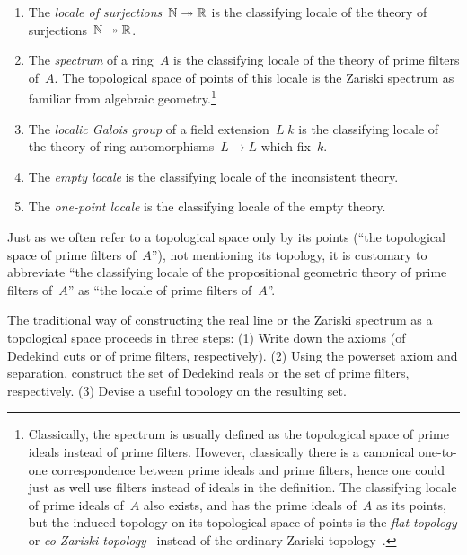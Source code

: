 \documentclass{ws-rv9x6}
\begin{document}
{\begin{enumerate}
The localic open unit interval is the classifying locale of the
same theory but with the additional axiom~$\top \vdash \alpha_0 \wedge \beta_1$.
\item The \emph{locale of surjections~$\mathbb{N} \twoheadrightarrow \mathbb{R}$} is the
classifying locale of the theory of surjections~$\mathbb{N} \twoheadrightarrow \mathbb{R}$.
\item The \emph{spectrum} of a ring~$A$ is the classifying locale of the
theory of prime filters of~$A$. The topological space of points of this locale
is the Zariski spectrum as familiar from algebraic
geometry.\footnote{Classically, the spectrum is usually defined as the
topological space of prime ideals instead of prime filters. However,
classically there is a canonical one-to-one correspondence between prime ideals
and prime filters, hence one could just as well use filters instead of ideals
in the definition. The classifying locale of prime ideals of~$A$ also exists,
and has the prime ideals of~$A$ as its points, but the induced topology on its
topological space of points is the \emph{flat topology} or \emph{co-Zariski
topology}~\cite{tarizadeh:flat} instead of the ordinary
Zariski topology~\cite[Proposition~4.5]{johnstone:rings-fields-and-spectra}.}
\item The \emph{localic Galois group} of a field extension~$L|k$ is the
classifying locale of the theory of ring automorphisms~$L \to L$ which fix~$k$.
\item The \emph{empty locale} is the classifying locale of the inconsistent theory.
\item The \emph{one-point locale} is the classifying locale of the empty theory.
\end{enumerate}

Just as we often refer to a topological space only by its points (``the
topological space of prime filters of~$A$''), not mentioning its topology, it is
customary to abbreviate ``the classifying locale of the propositional geometric
theory of prime filters of~$A$'' as ``the locale of prime filters of~$A$''.

\begin{remark}\label{rem:traditional-spaces}
The traditional way of constructing the real line or the Zariski
spectrum as a topological space proceeds in three steps: (1) Write down the
axioms (of Dedekind cuts or of prime filters, respectively). (2) Using the powerset
axiom and separation, construct the set of Dedekind reals or the set
of prime filters, respectively. (3) Devise a useful topology on the resulting set.


\end{remark}}
\end{document}
